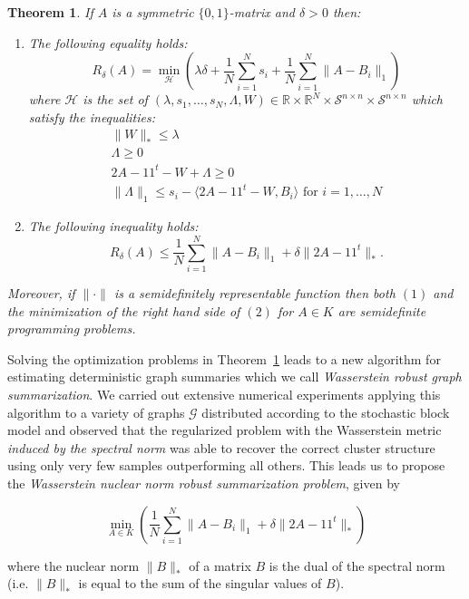 \documentclass[12pt]{amsart}
\newtheorem{theorem}[lemma]{Theorem}
\theoremstyle{remark}
\newcommand{\RR}{\mathbb{R}}
\newcommand{\grG}{{\mathcal{G}}}
\begin{document}
\begin{theorem}\label{Thm: tractable}If $A$ is a symmetric $\{0,1\}$-matrix and $\delta>0$ then:
\begin{enumerate}
\item{  The following equality holds:
\[
R_{\delta}(A)=\min_{\mathcal{H}} \left(\lambda\delta +\frac{1}{N}\sum_{i=1}^N s_i+\frac{1}{N}\sum_{i=1}^N\|A-B_i\|_1\right)
\]
where $\mathcal{H}$ is the set of $(\lambda, s_1,\dots, s_N,\Lambda, W)\in \RR\times\RR^N\times \mathcal{S}^{n\times n} \times \mathcal{S}^{n\times n}$ which satisfy the inequalities:
\[
\begin{array}{l}
\|W\|_{*}\leq \lambda\\
\Lambda \geq 0\\
2A-11^t-W + \Lambda \geq 0\\
\|\Lambda\|_{1}\leq s_i-\langle 2A-11^t-W, B_i\rangle\text{ for $i=1,\dots, N$}
\end{array}
\]}
\item The following inequality holds:
\[R_{\delta}(A)\leq \frac{1}{N}\sum_{i=1}^N\|A-B_i\|_1+ \delta\|2A-11^t\|_*.\]
\end{enumerate}
Moreover, if $\|\cdot\|$ is a semidefinitely representable function then both $(1)$ and the minimization of the right hand side of $(2)$ for $A\in K$ are semidefinite programming problems.
\end{theorem}

Solving the optimization problems in Theorem~\ref{Thm: tractable} leads to a new algorithm for estimating deterministic graph summaries which we call {\it Wasserstein robust graph summarization}. We carried out extensive numerical experiments applying this algorithm to a variety of graphs $\grG$ distributed according to the stochastic block model and observed that the regularized problem with the Wasserstein metric {\it induced by the spectral norm} was able to recover the correct cluster structure using only very few samples outperforming all others. This leads us to propose the {\it Wasserstein nuclear norm robust summarization problem}, given by

\begin{equation}\label{WRNNS}
\min_{A\in K} \left(\frac{1}{N}\sum_{i=1}^N\|A-B_i\|_1+ \delta\|2A-11^t\|_*\right) 
\end{equation}

where the nuclear norm $\|B\|_*$ of a matrix $B$ is the dual of the spectral norm (i.e. $\|B\|_*$ is equal to the sum of the singular values of $B$).
\end{document}
